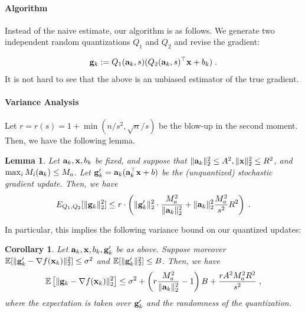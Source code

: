 \documentclass{article}
\def\a{{\bf a}}
\def\g{{\bf g}}
\def\x{{\bf x}}
\def\E{\mathbb{E}}
\newtheorem{lemma}{Lemma}
\newtheorem{corollary}{Corollary}
\begin{document}
\paragraph{Algorithm}
Instead of the naive estimate, our algorithm is as follows.
We generate two independent
random quantizations $Q_1$
and $Q_2$ and revise the gradient:


\[
\g_k := Q_1 (\a_k, s) (Q_2 (\a_k, s)^\top \x + b_k) \; .
\]
It is not hard to see that the above is an unbiased estimator of the true gradient.

\paragraph{Variance Analysis}

Let $r = r(s) = 1 + \min (n / s^2, \sqrt{n}/ s)$ be the blow-up in the second moment.
Then, we have the following lemma.
\begin{lemma}
\label{lem:qbound}
    Let $\a_k, \x, b_k$ be fixed, and suppose that $\| \a_k \|_2^2 \leq A^2, \| \x \|_2^2 \leq R^2$, and $\max_i M_i (\a_k) \leq M_a$.
    Let $\g'_k = \a_k (\a_k^\top \x + b)$ be the (unquantized) stochastic gradient update.
    Then, we have 
    \[
    E_{Q_1, Q_2} [\| \g_k \|_2^2] \leq r \cdot \left( \| \g'_k \|_2^2 \cdot \frac{M_a^2}{\| \a_k \|_2^2} + \| \a_k \|_2^2 \frac{M_a^2}{s^2} R^2 \right)\; .
    \]
\end{lemma}

In particular, this implies the following variance bound on our quantized updates:
\begin{corollary}
    Let $\a_k, \x, b_k, \g'_k$ be as above.
    Suppose moreover $\E [\| \g'_k - \nabla f(\x_k) \|_2^2 ] \leq \sigma^2$ and $\E [\| \g'_k \|_2^2] \leq B$.
    Then, we have
    \[
    \E \left[ \| \g_k - \nabla f(\x_k) \|_2^2 \right] \leq  \sigma^2 + \left(r \frac{M_a^2}{\| \a_k \|_2^2} - 1\right) B + \frac{r A^2 M_a^2 R^2}{s^2} \; ,
    \]
    where the expectation is taken over $\g'_k$ and the randomness of the quantization.
\end{corollary}
\end{document}
